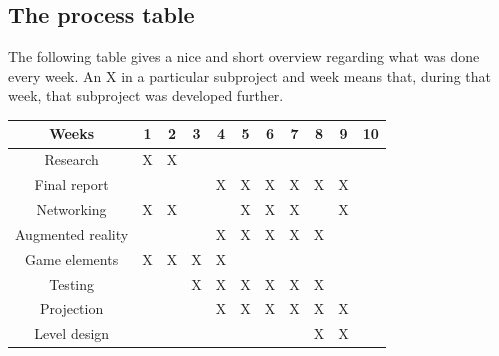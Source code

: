 		\subsection{The process table} \label{ssec:processtable}
			The following table gives a nice and short overview regarding what was done
			every week. An X in a particular subproject and week means that, during that
			week, that subproject was developed further.
			
			\begin{table}[!ht]                                                                                      
				\begin{tabular}{| c | c | c | c | c | c | c | c | c | c | c |}
				\hline
				Weeks             & 1      & 2      & 3      & 4      & 5      & 6      & 7      & 8      & 9      & 10     \\ \hline
				Research          & X      & X      & \space & \space & \space & \space & \space & \space & \space & \space \\ \hline
				Final report      & \space & \space & \space & X     & X      & X      & X      & X      & X      & \space \\ \hline\sqrt{}
				Networking        & X      & X      & \space & \space & X      & X      & X      & \space & X      & \space \\ \hline
				Augmented reality & \space & \space & \space & X      & X      & X      & X      & X      & \space & \space \\ \hline
				Game elements     & X      & X      & X      & X      & \space & \space & \space & \space & \space & \space \\ \hline
				Testing           & \space & \space & X      & X      & X      & X      & X      & X      & \space & \space \\ \hline
				Projection        & \space & \space & \space & X      & X      & X      & X      & X      & X      & \space \\ \hline
				Level design      & \space & \space & \space & \space & \space & \space & \space & X      & X      & \space \\ \hline
				\end{tabular}
			\end{table}
